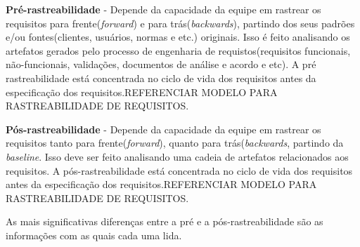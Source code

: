 \textbf{Pré-rastreabilidade} - Depende da capacidade da equipe em rastrear os requisitos para frente(\textit{forward}) e para trás(\textit{backwards}), partindo dos seus padrões e/ou fontes(clientes, usuários, normas e etc.) originais. Isso é feito analisando os artefatos gerados pelo processo de engenharia de requistos(requisitos funcionais, não-funcionais, validações, documentos de análise e acordo e etc). A pré rastreabilidade está concentrada no ciclo de vida dos requisitos antes da especificação dos requisitos.REFERENCIAR MODELO PARA RASTREABILIDADE DE REQUISITOS.

\textbf{Pós-rastreabilidade} - Depende da capacidade da equipe em rastrear os requisitos tanto para frente(\textit{forward}), quanto para trás(\textit{backwards}, partindo da \textit{baseline}. Isso deve ser feito analisando uma cadeia de artefatos relacionados aos requisitos. A pós-rastreabilidade está concentrada no ciclo de vida dos requisitos antes da especificação dos requisitos.REFERENCIAR MODELO PARA RASTREABILIDADE DE REQUISITOS.

As mais significativas diferenças entre a pré e a pós-rastreabilidade são as informações com as quais cada uma lida.